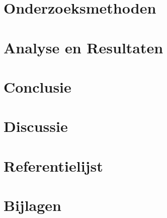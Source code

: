 \documentclass[a4paper,12pt]{report}
\begin{document}
\chapter{Onderzoeksmethoden}

\chapter{Analyse en Resultaten}

\chapter{Conclusie}

\chapter{Discussie}

\chapter{Referentielijst}

\chapter{Bijlagen}
\end{document}
